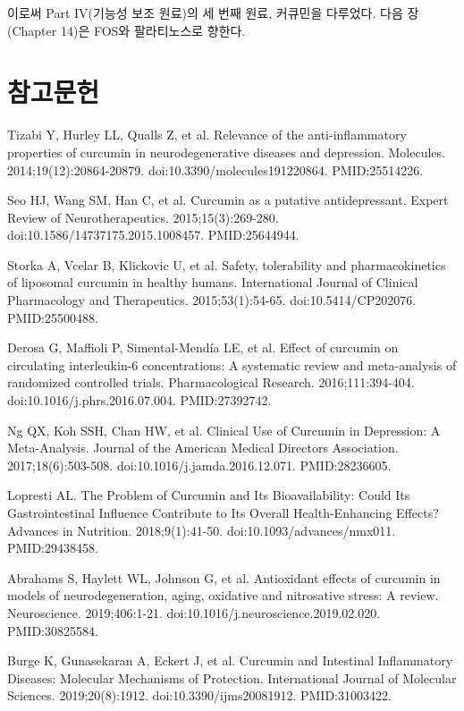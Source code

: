 \documentclass[12pt,oneside]{book}
\newcommand{\refstart}{\par\begingroup\fontsize{8.5pt}{10.2pt}\selectfont\setlength{\parskip}{1.4pt}\raggedright}
\newcommand{\reff}[2]{\par\hangindent=7mm\hangafter=1\noindent[#1]\hspace{2mm}#2\par}
\begin{document}
이로써 Part IV(기능성 보조 원료)의 세 번째 원료, 커큐민을 다루었다. 다음 장(Chapter 14)은 FOS와 팔라티노스로 향한다.

\section*{참고문헌}

\refstart

\reff{1}{Tizabi Y, Hurley LL, Qualls Z, et al. Relevance of the anti-inflammatory properties of curcumin in neurodegenerative diseases and depression. Molecules. 2014;19(12):20864-20879. doi:10.3390/molecules191220864. PMID:25514226.}

\reff{2}{Seo HJ, Wang SM, Han C, et al. Curcumin as a putative antidepressant. Expert Review of Neurotherapeutics. 2015;15(3):269-280. doi:10.1586/14737175.2015.1008457. PMID:25644944.}

\reff{3}{Storka A, Vcelar B, Klickovic U, et al. Safety, tolerability and pharmacokinetics of liposomal curcumin in healthy humans. International Journal of Clinical Pharmacology and Therapeutics. 2015;53(1):54-65. doi:10.5414/CP202076. PMID:25500488.}

\reff{4}{Derosa G, Maffioli P, Simental-Mendía LE, et al. Effect of curcumin on circulating interleukin-6 concentrations: A systematic review and meta-analysis of randomized controlled trials. Pharmacological Research. 2016;111:394-404. doi:10.1016/j.phrs.2016.07.004. PMID:27392742.}

\reff{5}{Ng QX, Koh SSH, Chan HW, et al. Clinical Use of Curcumin in Depression: A Meta-Analysis. Journal of the American Medical Directors Association. 2017;18(6):503-508. doi:10.1016/j.jamda.2016.12.071. PMID:28236605.}

\reff{6}{Lopresti AL. The Problem of Curcumin and Its Bioavailability: Could Its Gastrointestinal Influence Contribute to Its Overall Health-Enhancing Effects? Advances in Nutrition. 2018;9(1):41-50. doi:10.1093/advances/nmx011. PMID:29438458.}

\reff{7}{Abrahams S, Haylett WL, Johnson G, et al. Antioxidant effects of curcumin in models of neurodegeneration, aging, oxidative and nitrosative stress: A review. Neuroscience. 2019;406:1-21. doi:10.1016/j.neuroscience.2019.02.020. PMID:30825584.}

\reff{8}{Burge K, Gunasekaran A, Eckert J, et al. Curcumin and Intestinal Inflammatory Diseases: Molecular Mechanisms of Protection. International Journal of Molecular Sciences. 2019;20(8):1912. doi:10.3390/ijms20081912. PMID:31003422.}
\end{document}
